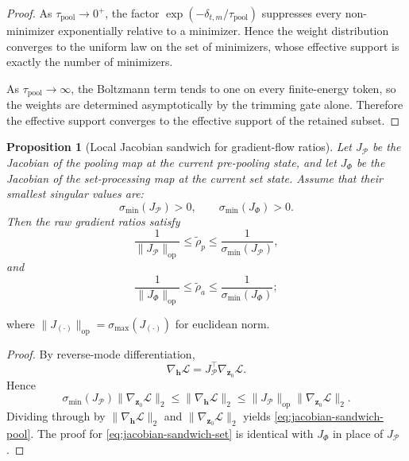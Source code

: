 \documentclass{article}
\theoremstyle{plain}
\newtheorem{proposition}[theorem]{Proposition}
\theoremstyle{definition}
\theoremstyle{remark}
\begin{document}
\begin{proof}
As $\tau_{\mathrm{pool}}\to 0^+$, the factor $\exp(-\delta_{t,m}/\tau_{\mathrm{pool}})$ suppresses every non-minimizer exponentially relative to a minimizer. Hence the weight distribution converges to the uniform law on the set of minimizers, whose effective support is exactly the number of minimizers.

As $\tau_{\mathrm{pool}}\to \infty$, the Boltzmann term tends to one on every finite-energy token, so the weights are determined asymptotically by the trimming gate alone. Therefore the effective support converges to the effective support of the retained subset.
\end{proof}

\begin{proposition}[Local Jacobian sandwich for gradient-flow ratios]
\label{prop:jacobian-sandwich}
Let $J_{\mathcal{P}}$ be the Jacobian of the pooling map at the current pre-pooling state, and let $J_{\Phi}$ be the Jacobian of the set-processing map at the current set state. Assume that their smallest singular values are:
\[
\sigma_{\min}(J_{\mathcal{P}})>0,
\qquad
\sigma_{\min}(J_{\Phi})>0.
\]
Then the raw gradient ratios satisfy
\begin{equation}
\label{eq:jacobian-sandwich-pool}
\frac{1}{\|J_{\mathcal{P}}\|_{\mathrm{op}}}
\le
\tilde\rho_p
\le
\frac{1}{\sigma_{\min}(J_{\mathcal{P}})},
\end{equation}
and
\begin{equation}
\label{eq:jacobian-sandwich-set}
\frac{1}{\|J_{\Phi}\|_{\mathrm{op}}}
\le
\tilde\rho_a
\le
\frac{1}{\sigma_{\min}(J_{\Phi})};
\end{equation}
\end{proposition}
\noindent where $\|J_{(\cdot)}\|_{\mathrm{op}}=\sigma_{\max}(J_{(\cdot)})$ for euclidean norm.
\begin{proof}
By reverse-mode differentiation,
\[
\nabla_{\mathbf{h}}\mathcal{L}
=
J_{\mathcal{P}}^{\top}\nabla_{\mathbf{z}_0}\mathcal{L}.
\]
Hence
\[
\sigma_{\min}(J_{\mathcal{P}})\|\nabla_{\mathbf{z}_0}\mathcal{L}\|_2
\le
\|\nabla_{\mathbf{h}}\mathcal{L}\|_2
\le
\|J_{\mathcal{P}}\|_{\mathrm{op}}
\|\nabla_{\mathbf{z}_0}\mathcal{L}\|_2.
\]
Dividing through by $\|\nabla_{\mathbf{h}}\mathcal{L}\|_2$ and $\|\nabla_{\mathbf{z}_0}\mathcal{L}\|_2$ yields \eqref{eq:jacobian-sandwich-pool}. The proof for \eqref{eq:jacobian-sandwich-set} is identical with $J_{\Phi}$ in place of $J_{\mathcal{P}}$.
\end{proof}
\end{document}
